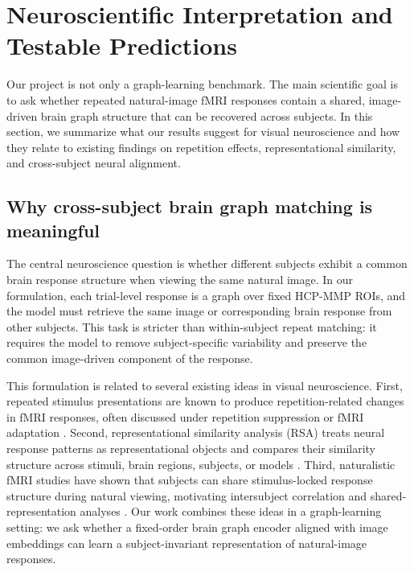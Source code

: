 \documentclass{article}
\begin{document}
\section{Neuroscientific Interpretation and Testable Predictions}
\label{sec:neuro_interpretation}

Our project is not only a graph-learning benchmark. The main scientific goal is to ask whether repeated natural-image fMRI responses contain a shared, image-driven brain graph structure that can be recovered across subjects. In this section, we summarize what our results suggest for visual neuroscience and how they relate to existing findings on repetition effects, representational similarity, and cross-subject neural alignment.

\subsection{Why cross-subject brain graph matching is meaningful}

The central neuroscience question is whether different subjects exhibit a common brain response structure when viewing the same natural image. In our formulation, each trial-level response is a graph over fixed HCP-MMP ROIs, and the model must retrieve the same image or corresponding brain response from other subjects. This task is stricter than within-subject repeat matching: it requires the model to remove subject-specific variability and preserve the common image-driven component of the response.

This formulation is related to several existing ideas in visual neuroscience. First, repeated stimulus presentations are known to produce repetition-related changes in fMRI responses, often discussed under repetition suppression or fMRI adaptation \citep{grill2001fmri,henson2003repetition,grill2006repetition,krekelberg2006adaptation}. Second, representational similarity analysis (RSA) treats neural response patterns as representational objects and compares their similarity structure across stimuli, brain regions, subjects, or models \citep{kriegeskorte2008rsa}. Third, naturalistic fMRI studies have shown that subjects can share stimulus-locked response structure during natural viewing, motivating intersubject correlation and shared-representation analyses \citep{hasson2004isc,haxby2011hyperalignment,nastase2019isc}. Our work combines these ideas in a graph-learning setting: we ask whether a fixed-order brain graph encoder aligned with image embeddings can learn a subject-invariant representation of natural-image responses.
\end{document}
